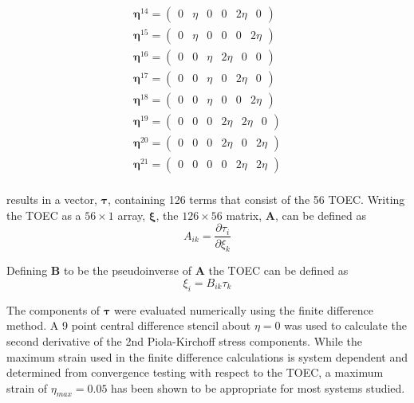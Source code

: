 \documentclass[showpacs,aps,floatfix,prb,reprint,superscriptaddress,onecolumn]{revtex4-1}
\begin{document}
\begin{enumerate}
\begin{subequations}
\begin{align}
    	\bm{\eta}^{14} =\left(\begin{matrix} 0 & \eta & 0 & 0 & 2\eta & 0 \end{matrix}\right)\\
    	\bm{\eta}^{15} =\left(\begin{matrix} 0 & \eta & 0 & 0 & 0 & 2\eta \end{matrix}\right)\\
    	\bm{\eta}^{16} =\left(\begin{matrix} 0 & 0 & \eta & 2\eta & 0 & 0 \end{matrix}\right)\\
    	\bm{\eta}^{17} =\left(\begin{matrix} 0 & 0 & \eta & 0 & 2\eta & 0 \end{matrix}\right)\\
    	\bm{\eta}^{18} =\left(\begin{matrix} 0 & 0 & \eta & 0 & 0 & 2\eta \end{matrix}\right)\\
    	\bm{\eta}^{19} =\left(\begin{matrix} 0 & 0 & 0 & 2\eta & 2\eta & 0 \end{matrix}\right)\\
    	\bm{\eta}^{20} =\left(\begin{matrix} 0 & 0 & 0 & 2\eta & 0 & 2\eta \end{matrix}\right)\\
    	\bm{\eta}^{21} =\left(\begin{matrix} 0 & 0 & 0 & 0 & 2\eta & 2\eta \end{matrix}\right)\\
\end{align}
\end{subequations}
 

results in a vector, $\bm{\tau}$, containing 126 terms that consist of the 56 TOEC.  Writing the TOEC as a $56\times1$ array, $\bm{\xi}$, the $126\times56$ matrix, $\bm{A}$, can be defined as
\begin{equation}
A_{ik} = \frac{\partial \tau_i}{\partial \xi_k}
\end{equation}

Defining $\bm{B}$ to be the pseudoinverse of $\bm{A}$ the TOEC can be defined as
\begin{equation}
\xi_i = B_{i k} \tau_k
\end{equation}

The components of $\bm{\tau}$ were evaluated numerically using the finite difference method.  A 9 point central difference stencil about $\eta=0$ was used to calculate the second derivative of the 2nd Piola-Kirchoff stress components.    While the maximum strain used in the finite difference calculations is system dependent and determined from convergence testing with respect to the TOEC, a maximum strain of $\eta_{max} = 0.05$ has been shown to be appropriate for most systems studied.


\end{enumerate}
\end{document}
